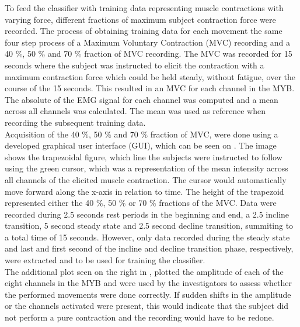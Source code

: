 To feed the classifier with training data representing muscle contractions with varying force, different fractions of maximum subject contraction force were recorded. The process of obtaining training data for each movement the same four step process of a Maximum Voluntary Contraction (MVC) recording and a 40 $\percent$, 50 $\percent$ and 70 $\percent$ fraction of MVC recording.
The MVC was recorded for 15 seconds where the subject was instructed to elicit the contraction with a maximum contraction force which could be held steady, without fatigue, over the course of the 15 seconds. This resulted in an MVC for each channel in the MYB. The absolute of the EMG signal for each channel was computed and a mean across all channels was calculated. The mean was used as reference when recording the subsequent training data. \\
Acquisition of the 40 $\percent$, 50 $\percent$ and 70 $\percent$ fraction of MVC, were done using a developed graphical user interface (GUI), which can be seen on . The image shows the trapezoidal figure, which line the subjects were instructed to follow using the green cursor, which was a representation of the mean intensity across all channels of the elicited muscle contraction. The cursor would automatically move forward along the x-axis in relation to time. The height of the trapezoid represented either the 40 $\percent$, 50 $\percent$ or 70 $\percent$ fractions of the MVC. Data were recorded during 2.5 seconds rest periods in the beginning and end, a 2.5 incline transition, 5 second steady state and 2.5 second decline transition, summiting to a total time of 15 seconds. However, only data recorded during the steady state and last and first second of the incline and decline transition phase, respectively, were extracted and to be used for training the classifier. \\
The additional plot seen on the right in , plotted the amplitude of each of the eight channels in the MYB and were used by the investigators to assess whether the performed movements were done correctly. If sudden shifts in the amplitude or the channels activated were present, this would indicate that the subject did not perform a pure contraction and the recording would have to be redone.   
   
   
